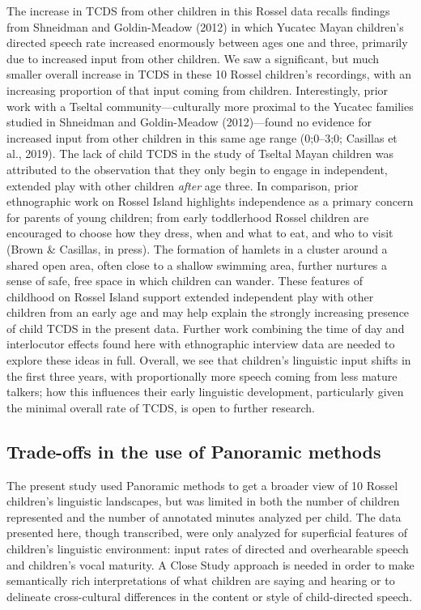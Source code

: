 \documentclass[,man,floatsintext]{apa6}
\begin{document}
The increase in TCDS from other children in this Rossel data recalls
findings from Shneidman and Goldin-Meadow (2012) in which Yucatec Mayan
children's directed speech rate increased enormously between ages one
and three, primarily due to increased input from other children. We saw
a significant, but much smaller overall increase in TCDS in these 10
Rossel children's recordings, with an increasing proportion of that
input coming from children. Interestingly, prior work with a Tseltal
community---culturally more proximal to the Yucatec families studied in
Shneidman and Goldin-Meadow (2012)---found no evidence for increased
input from other children in this same age range (0;0--3;0; Casillas et
al., 2019). The lack of child TCDS in the study of Tseltal Mayan
children was attributed to the observation that they only begin to
engage in independent, extended play with other children \emph{after}
age three. In comparison, prior ethnographic work on Rossel Island
highlights independence as a primary concern for parents of young
children; from early toddlerhood Rossel children are encouraged to
choose how they dress, when and what to eat, and who to visit (Brown \&
Casillas, in press). The formation of hamlets in a cluster around a
shared open area, often close to a shallow swimming area, further
nurtures a sense of safe, free space in which children can wander. These
features of childhood on Rossel Island support extended independent play
with other children from an early age and may help explain the strongly
increasing presence of child TCDS in the present data. Further work
combining the time of day and interlocutor effects found here with
ethnographic interview data are needed to explore these ideas in full.
Overall, we see that children's linguistic input shifts in the first
three years, with proportionally more speech coming from less mature
talkers; how this influences their early linguistic development,
particularly given the minimal overall rate of TCDS, is open to further
research.

\subsection{Trade-offs in the use of Panoramic
methods}\label{trade-offs-in-the-use-of-panoramic-methods}

The present study used Panoramic methods to get a broader view of 10
Rossel children's linguistic landscapes, but was limited in both the
number of children represented and the number of annotated minutes
analyzed per child. The data presented here, though transcribed, were
only analyzed for superficial features of children's linguistic
environment: input rates of directed and overhearable speech and
children's vocal maturity. A Close Study approach is needed in order to
make semantically rich interpretations of what children are saying and
hearing or to delineate cross-cultural differences in the content or
style of child-directed speech.
\end{document}
